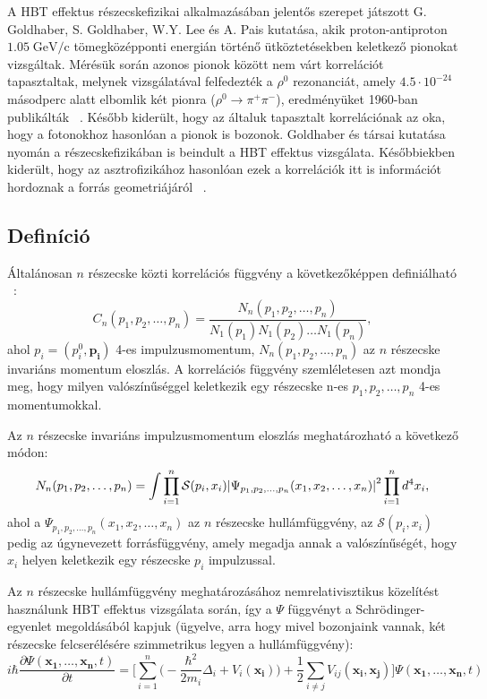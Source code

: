 \documentclass[11pt,a4paper]{article}
\numberwithin{equation}{subsection}
\numberwithin{figure}{section}
\begin{document}
A HBT effektus részecskefizikai alkalmazásában jelentős szerepet játszott G. Goldhaber, S. Goldhaber, W.Y. Lee és A. Pais kutatása, akik proton-antiproton $1.05\;\mathrm{GeV/c}$ tömegközépponti energián történő ütköztetésekben keletkező pionokat vizsgáltak. Mérésük során azonos pionok között nem várt korrelációt tapasztaltak, melynek vizsgálatával felfedezték a $\rho^0$ rezonanciát, amely $4.5\cdot 10^{-24}$ másodperc alatt elbomlik két pionra ($\rho^0\rightarrow \pi^+\pi^-$), eredményüket 1960-ban publikálták ~\cite{Goldhaber:1960sf}. Később kiderült, hogy az általuk tapasztalt korrelációnak az oka, hogy a fotonokhoz hasonlóan a pionok is bozonok. Goldhaber és társai kutatása nyomán a részecskefizikában is beindult a HBT effektus vizsgálata. Későbbiekben kiderült, hogy az asztrofizikához hasonlóan ezek a korrelációk itt is információt hordoznak a forrás geometriájáról ~\cite{Padula:2004ba, CsanadHabil}. 


\subsection{Definíció}

Általánosan $n$ részecske közti korrelációs függvény a következőképpen definiálható ~\cite{Alt:1999cs, Csorgo:1999sj}:
\begin{equation}
C_n(p_1, p_2, \dots, p_n)=\frac{ N_n(p_1, p_2, \dots, p_n)  }{ N_1(p_1)N_1(p_2)\dots N_1(p_n)},
\label{eq:Cn}
\end{equation}
ahol $p_i=(p_i^0, \bm{p_i})$ 4-es impulzusmomentum, $ N_n(p_1, p_2, \dots, p_n)$ az $n$ részecske invariáns momentum eloszlás. A korrelációs függvény szemléletesen azt mondja meg, hogy milyen valószínűséggel keletkezik egy részecske n-es $p_1, p_2, \dots, p_n$ 4-es momentumokkal.

Az $n$ részecske invariáns impulzusmomentum eloszlás meghatározható a következő módon:
\begin{equation}
N_n(p_1, p_2, \dots, p_n) = \int \prod_{i=1}^{n}\mathcal{S}(p_i, x_i)\abs{\Psi_{p_1, {p_2}, \dots, {p_n}}({x_1}, {x_2}, \dots, {x_n})}^2\prod_{i=1}^{n}d^4 x_i,
\label{eq:Nn}
\end{equation}
ahol a $\Psi_{p_1, {p_2}, \dots, {p_n}}({x_1}, {x_2}, \dots, {x_n})$ az $n$ részecske hullámfüggvény, az $\mathcal{S}({p_i}, {x_i})$ pedig az úgynevezett forrásfüggvény, amely megadja annak a valószínűségét, hogy ${x_i}$ helyen keletkezik egy részecske ${p_i}$ impulzussal.

Az $n$ részecske hullámfüggvény meghatározásához nemrelativisztikus közelítést használunk HBT effektus vizsgálata során, így a $\Psi$ függvényt a Schrödinger-egyenlet megoldásából kapjuk (ügyelve, arra hogy mivel bozonjaink vannak, két részecske felcserélésére szimmetrikus legyen a hullámfüggvény):
\begin{equation}
i\hbar\frac{\partial \Psi(\bm{x_1},\dots, \bm{x_n},t )}{\partial t} = \Bigg[\sum_{i=1}^{n}\bigg(-\frac{\hbar^2}{2m_i}\Delta_i + V_i(\bm{x_i})\bigg) + \frac{1}{2}\sum_{i\neq j} V_{ij}(\bm{x_i},\bm{x_j})\Bigg]\Psi(\bm{x_1},\dots, \bm{x_n} ,t)
\label{eq:Sch0}
\end{equation}
\end{document}
